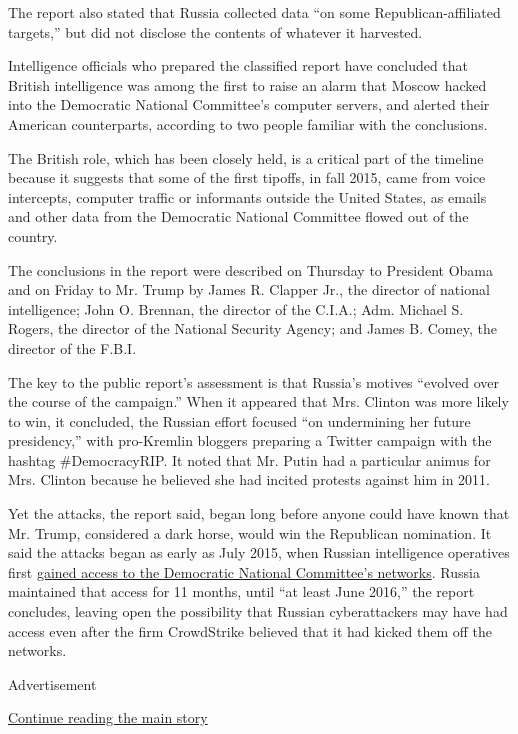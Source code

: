 The report also stated that Russia collected data ``on some
Republican-affiliated targets,'' but did not disclose the contents of
whatever it harvested.

Intelligence officials who prepared the classified report have concluded
that British intelligence was among the first to raise an alarm that
Moscow hacked into the Democratic National Committee's computer servers,
and alerted their American counterparts, according to two people
familiar with the conclusions.

The British role, which has been closely held, is a critical part of the
timeline because it suggests that some of the first tipoffs, in fall
2015, came from voice intercepts, computer traffic or informants outside
the United States, as emails and other data from the Democratic National
Committee flowed out of the country.

The conclusions in the report were described on Thursday to President
Obama and on Friday to Mr. Trump by James R. Clapper Jr., the director
of national intelligence; John O. Brennan, the director of the C.I.A.;
Adm. Michael S. Rogers, the director of the National Security Agency;
and James B. Comey, the director of the F.B.I.

The key to the public report's assessment is that Russia's motives
``evolved over the course of the campaign.'' When it appeared that Mrs.
Clinton was more likely to win, it concluded, the Russian effort focused
``on undermining her future presidency,'' with pro-Kremlin bloggers
preparing a Twitter campaign with the hashtag \#DemocracyRIP. It noted
that Mr. Putin had a particular animus for Mrs. Clinton because he
believed she had incited protests against him in 2011.

Yet the attacks, the report said, began long before anyone could have
known that Mr. Trump, considered a dark horse, would win the Republican
nomination. It said the attacks began as early as July 2015, when
Russian intelligence operatives first
\href{https://www.nytimes.com/2016/12/13/us/politics/russia-hack-election-dnc.html}{gained
access to the Democratic National Committee's networks}. Russia
maintained that access for 11 months, until ``at least June 2016,'' the
report concludes, leaving open the possibility that Russian
cyberattackers may have had access even after the firm CrowdStrike
believed that it had kicked them off the networks.

Advertisement

\protect\hyperlink{after-bottom}{Continue reading the main story}

